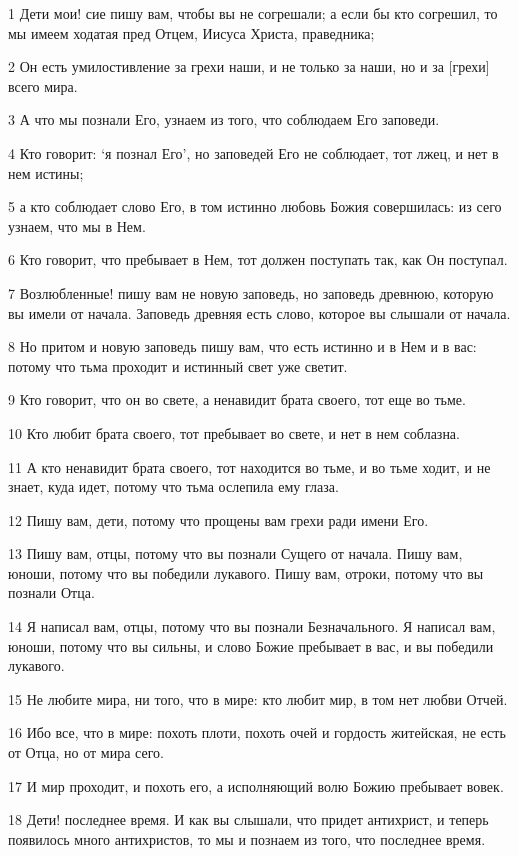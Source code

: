 \par 1 Дети мои! сие пишу вам, чтобы вы не согрешали; а если бы кто согрешил, то мы имеем ходатая пред Отцем, Иисуса Христа, праведника;
\par 2 Он есть умилостивление за грехи наши, и не только за наши, но и за [грехи] всего мира.
\par 3 А что мы познали Его, узнаем из того, что соблюдаем Его заповеди.
\par 4 Кто говорит: `я познал Его', но заповедей Его не соблюдает, тот лжец, и нет в нем истины;
\par 5 а кто соблюдает слово Его, в том истинно любовь Божия совершилась: из сего узнаем, что мы в Нем.
\par 6 Кто говорит, что пребывает в Нем, тот должен поступать так, как Он поступал.
\par 7 Возлюбленные! пишу вам не новую заповедь, но заповедь древнюю, которую вы имели от начала. Заповедь древняя есть слово, которое вы слышали от начала.
\par 8 Но притом и новую заповедь пишу вам, что есть истинно и в Нем и в вас: потому что тьма проходит и истинный свет уже светит.
\par 9 Кто говорит, что он во свете, а ненавидит брата своего, тот еще во тьме.
\par 10 Кто любит брата своего, тот пребывает во свете, и нет в нем соблазна.
\par 11 А кто ненавидит брата своего, тот находится во тьме, и во тьме ходит, и не знает, куда идет, потому что тьма ослепила ему глаза.
\par 12 Пишу вам, дети, потому что прощены вам грехи ради имени Его.
\par 13 Пишу вам, отцы, потому что вы познали Сущего от начала. Пишу вам, юноши, потому что вы победили лукавого. Пишу вам, отроки, потому что вы познали Отца.
\par 14 Я написал вам, отцы, потому что вы познали Безначального. Я написал вам, юноши, потому что вы сильны, и слово Божие пребывает в вас, и вы победили лукавого.
\par 15 Не любите мира, ни того, что в мире: кто любит мир, в том нет любви Отчей.
\par 16 Ибо все, что в мире: похоть плоти, похоть очей и гордость житейская, не есть от Отца, но от мира сего.
\par 17 И мир проходит, и похоть его, а исполняющий волю Божию пребывает вовек.
\par 18 Дети! последнее время. И как вы слышали, что придет антихрист, и теперь появилось много антихристов, то мы и познаем из того, что последнее время.
